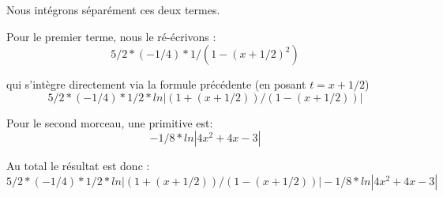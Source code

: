 \documentclass[12pt,french,oneside,a4paper]{memoir} %
\begin{document}
\begin{exo}
\begin{correction}
Nous intégrons séparément ces deux termes.

Pour le premier terme, nous le ré-écrivons :
\begin{equation*}
5/2 * (-1/4) * 1/(1 - (x + 1/2)^2)
\end{equation*}

qui s'intègre directement via la formule précédente (en posant $t = x + 1/2$)
\begin{equation*}
5/2 * (-1/4) * 1/2 * ln|(1 + (x + 1/2))/(1 - (x + 1/2))|
\end{equation*}


Pour le second morceau, une primitive est:
\begin{equation*}
-1/8 * ln|4x^2 + 4x - 3|
\end{equation*}

Au total le résultat est donc :
\begin{equation*}
5/2 * (-1/4) * 1/2 * ln|(1 + (x + 1/2))/(1 - (x + 1/2))| - 1/8 * ln|4x^2 + 4x - 3|
\end{equation*}
\end{correction}
\end{exo}
\end{document}
